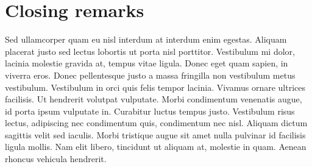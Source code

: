 \section{Closing remarks}
Sed ullamcorper quam eu nisl interdum at interdum enim egestas. Aliquam placerat justo sed lectus lobortis ut porta nisl porttitor. Vestibulum mi dolor, lacinia molestie gravida at, tempus vitae ligula. Donec eget quam sapien, in viverra eros. Donec pellentesque justo a massa fringilla non vestibulum metus vestibulum. Vestibulum in orci quis felis tempor lacinia. Vivamus ornare ultrices facilisis. Ut hendrerit volutpat vulputate. Morbi condimentum venenatis augue, id porta ipsum vulputate in. Curabitur luctus tempus justo. Vestibulum risus lectus, adipiscing nec condimentum quis, condimentum nec nisl. Aliquam dictum sagittis velit sed iaculis. Morbi tristique augue sit amet nulla pulvinar id facilisis ligula mollis. Nam elit libero, tincidunt ut aliquam at, molestie in quam. Aenean rhoncus vehicula hendrerit.